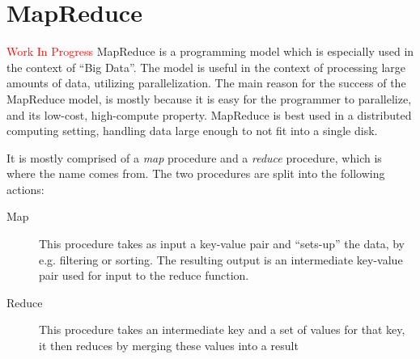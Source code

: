 \section{MapReduce} %
\label{sec:mapreduce_programming_model}
\textcolor{red}{Work In Progress}
MapReduce is a programming model which is especially used in the context of ``Big Data''. The model is useful in the context of processing large amounts of data, utilizing parallelization. The main reason for the success of the MapReduce model, is mostly because it is easy for the programmer to parallelize, and its low-cost, high-compute property. MapReduce is best used in a distributed computing setting, handling data large enough to not fit into a single disk.

It is mostly comprised of a \emph{map} procedure and a \emph{reduce} procedure, which is where the name comes from. The two procedures are split into the following actions:


\begin{description}
    \item[Map] This procedure takes as input a key-value pair and ``sets-up'' the data, by e.g. filtering or sorting. The resulting output is an intermediate key-value pair used for input to the reduce function.
    \item[Reduce] This procedure takes an intermediate key and a set of values for that key, it then reduces by merging these values into a result
\end{description}
